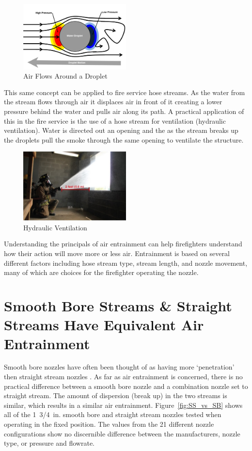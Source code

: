 \documentclass[12pt,oneside]{book}
\begin{document}
\begin{figure}[H]
\centering
\includegraphics[width=0.5\textwidth]{Figures/Air_Entrainment/Droplet_Etrainment.png}
\caption{Air Flows Around a Droplet}
\label{fig:droplet_flow}
\end{figure}

This same concept can be applied to fire service hose streams. As the water from the stream flows through air it displaces air in front of it creating a lower pressure behind the water and pulls air along its path. A practical application of this in the fire service is the use of a hose stream for ventilation (hydraulic ventilation). Water is directed out an opening and the as the stream breaks up the droplets pull the smoke through the same opening to ventilate the structure.

\begin{figure}[H]
\centering
\includegraphics[width=0.5\textwidth]{Figures/Air_Entrainment/Hydraulic_Ventilation.png}
\caption{Hydraulic Ventilation}
\label{fig:Hydraulic_Vent}
\end{figure}
 
Understanding the principals of air entrainment can help firefighters understand how their action will move more or less air. Entrainment is based on several different factors including hose stream type, stream length, and nozzle movement, many of which are choices for the firefighter operating the nozzle.

\section{Smooth Bore Streams \& Straight Streams Have Equivalent Air Entrainment} 
Smooth bore nozzles have often been thought of as having more `penetration' then straight stream nozzles \cite{Klaene:1}. As far as air entrainment is concerned, there is no practical difference between a smooth bore nozzle and a combination nozzle set to straight stream. The amount of dispersion (break up) in the two streams is similar, which results in a similar air entrainment. Figure~\ref{fig:SS_vs_SB} shows all of the 1~3/4~in. smooth bore and straight stream nozzles tested when operating in the fixed position. The values from the 21 different nozzle configurations show no discernible difference between the manufacturers, nozzle type, or pressure and flowrate.
\end{document}
